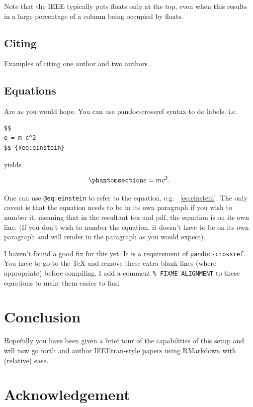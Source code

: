 \documentclass[a4paper,conference]{IEEEtran}
\let\citep\cite
\begin{document}
Note that the IEEE typically puts floats only at the top, even when this
results in a large percentage of a column being occupied by floats.

\subsection{Citing}\label{sec:citing}

Examples of citing one author \citep{Besag1974} and two authors
\citep{Besag1974, Besag1986}.

\subsection{Equations}\label{sec:equations}

Are as you would hope. You can use pandoc-crossref syntax to do labels.
i.e.

\begin{verbatim}
$$
e = m c^2
$$ {#eq:einstein}
\end{verbatim}

yields

\begin{equation}\protect\phantomsection\label{eq:einstein}{
e = m c^2.
}\end{equation}

One can use \texttt{@eq:einstein} to refer to the equation, e.g.
~\ref{eq:einstein}. The only caveat is that the equation needs to be in
its own paragraph if you wish to number it, meaning that in the
resultant tex and pdf, the equation is on its own line. (If you don't
wish to number the equation, it doesn't have to be on its own paragraph
and will render in the paragraph as you would expect).

I haven't found a good fix for this yet. It is a requirement of
\texttt{pandoc-crossref}. You have to go to the TeX and remove these
extra blank lines (where appropriate) before compiling. I add a comment
\texttt{\%\ FIXME\ ALIGNMENT} to these equations to make them easier to
find.

\section{Conclusion}\label{sec:conclusion}

Hopefully you have been given a brief tour of the capabilities of this
setup and will now go forth and author IEEEtran-style papers using
RMarkdown with (relative) ease.

\section*{Acknowledgement}\label{sec:acknowledgement}
\end{document}
